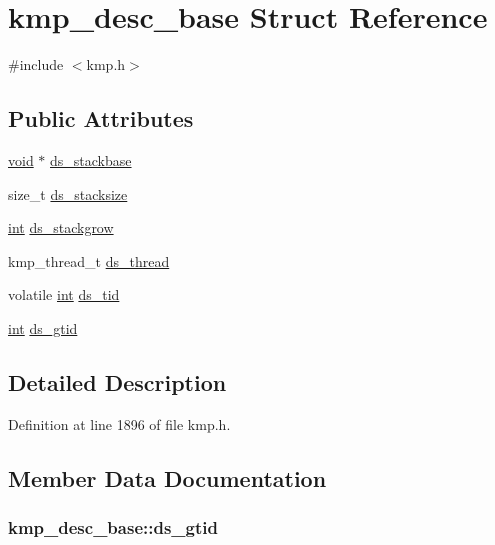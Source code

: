 \hypertarget{structkmp__desc__base}{\section{kmp\-\_\-desc\-\_\-base Struct Reference}
\label{structkmp__desc__base}
}


{\ttfamily \#include $<$kmp.\-h$>$}

\subsection*{Public Attributes}
\begin{DoxyCompactItemize}
\item 
\hyperlink{ittnotify__static_8h_af941d56e55e3c5465135b60c4d6343ed}{void} $\ast$ \hyperlink{structkmp__desc__base_a33d81d8dad4336633a06fb03206d74e7}{ds\-\_\-stackbase}
\item 
size\-\_\-t \hyperlink{structkmp__desc__base_a13fc21d4832e63d133b9cc28f4620197}{ds\-\_\-stacksize}
\item 
\hyperlink{ittnotify__static_8h_a8b8dcd723308a8cb5d84277c7a3fff70}{int} \hyperlink{structkmp__desc__base_a803a8f867d5c1a5d675aa03de8b3bc7b}{ds\-\_\-stackgrow}
\item 
kmp\-\_\-thread\-\_\-t \hyperlink{structkmp__desc__base_a870050b7c12984b85171ef1757335bff}{ds\-\_\-thread}
\item 
volatile \hyperlink{ittnotify__static_8h_a8b8dcd723308a8cb5d84277c7a3fff70}{int} \hyperlink{structkmp__desc__base_abc0ecc8ce19cd714e5c888c4383fb287}{ds\-\_\-tid}
\item 
\hyperlink{ittnotify__static_8h_a8b8dcd723308a8cb5d84277c7a3fff70}{int} \hyperlink{structkmp__desc__base_adaadada162cc10167fa30a29f87e71c6}{ds\-\_\-gtid}
\end{DoxyCompactItemize}


\subsection{Detailed Description}


Definition at line 1896 of file kmp.\-h.



\subsection{Member Data Documentation}
\hypertarget{structkmp__desc__base_adaadada162cc10167fa30a29f87e71c6}{
\subsubsection[{ds\-\_\-gtid}]{ kmp\-\_\-desc\-\_\-base\-::ds\-\_\-gtid}}\label{structkmp__desc__base_adaadada162cc10167fa30a29f87e71c6}


